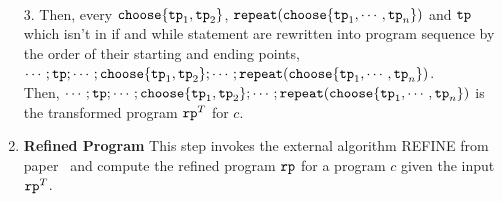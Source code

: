 \begin{enumerate}
\\
3. Then, every $\rpchoose{\tpath_1, \tpath_2 }$,  $\rprepeat(\rpchoose{\tpath_1, \cdots, \tpath_n})$ 
and $\mathtt{tp}$ which isn't in if and while statement 
are rewritten into program sequence  by the order of their starting and ending points,
$\cdots; \tpath;\cdots;  \rpchoose{\tpath_1, \tpath_2 }; \cdots; \rprepeat(\rpchoose{\tpath_1, \cdots, \tpath_n})$.
\\
Then, $\cdots; \tpath;\cdots;  \rpchoose{\tpath_1, \tpath_2 }; \cdots; \rprepeat(\rpchoose{\tpath_1, \cdots, \tpath_n})$
is the transformed program $\mathtt{rp}^{T}$ for $c$.
%
\item \textbf{Refined Program}
This step invokes the external algorithm REFINE from paper~\cite{GulwaniJK09} and compute the 
refined program $\mathtt{rp}$ for a program $c$ given the input $\mathtt{rp}^{T}$.
\end{enumerate}
%
%
